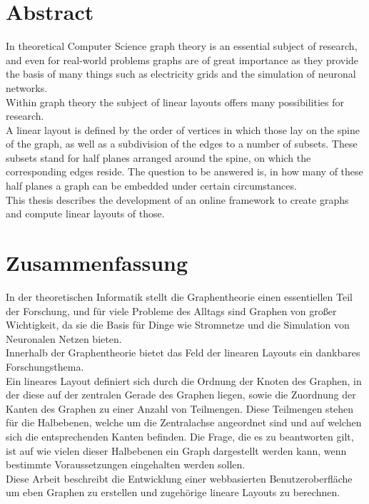 \documentclass[twoside,12pt,a4paper]{report}
\begin{document}

\setcounter{page}{1}


\section*{Abstract}
In theoretical Computer Science graph theory is an essential subject of research, and even for real-world problems graphs are of great importance as they provide the basis of many things such as electricity grids and the simulation of neuronal networks.\\
Within graph theory the subject of linear layouts offers many possibilities for research.\\
A linear layout is defined by the order of vertices in which those lay on the spine of the graph, as well as a subdivision of the edges to a number of subsets. These subsets stand for half planes arranged around the spine, on which the corresponding edges reside. The question to be answered is, in how many of these half planes a graph can be embedded under certain circumstances.\\
This thesis describes the development of an online framework to create graphs and compute linear layouts of those.

\newpage
\section*{Zusammenfassung}
In der theoretischen Informatik stellt die Graphentheorie einen essentiellen Teil der Forschung, und für viele Probleme des Alltags sind Graphen von großer Wichtigkeit, da sie die Basis für Dinge wie Stromnetze und die Simulation von Neuronalen Netzen bieten.\\
Innerhalb der Graphentheorie bietet das Feld der linearen Layouts ein dankbares Forschungsthema.\\
Ein lineares Layout definiert sich durch die Ordnung der Knoten des Graphen, in der diese auf der zentralen Gerade des Graphen liegen, sowie die Zuordnung der Kanten des Graphen zu einer Anzahl von Teilmengen. Diese Teilmengen stehen für die Halbebenen, welche um die Zentralachse angeordnet sind und auf welchen sich die entsprechenden Kanten befinden. Die Frage, die es zu beantworten gilt, ist auf wie vielen dieser Halbebenen ein Graph dargestellt werden kann, wenn bestimmte Voraussetzungen eingehalten werden sollen.\\
Diese Arbeit beschreibt die Entwicklung einer webbasierten Benutzeroberfläche um eben Graphen zu erstellen und zugehörige lineare Layouts zu berechnen.
\newpage
\end{document}
